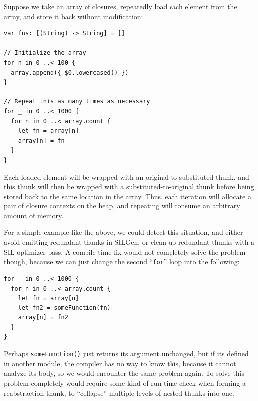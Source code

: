 \documentclass[../generics]{subfiles}
\begin{document}
\begin{example}
Suppose we take an array of closures, repeatedly load each element from the array, and store it back without modification:
\begin{Verbatim}
var fns: [(String) -> String] = []

// Initialize the array
for n in 0 ..< 100 {
  array.append({ $0.lowercased() })
}

// Repeat this as many times as necessary
for _ in 0 ..< 1000 {
  for n in 0 ..< array.count {
    let fn = array[n]
    array[n] = fn
  }
}
\end{Verbatim}
Each loaded element will be wrapped with an original-to-substituted thunk, and this thunk will then be wrapped with a substituted-to-original thunk before being stored back to the same location in the array. Thus, each iteration will allocate a pair of closure contexts on the heap, and repeating will consume an arbitrary amount of memory.

For a simple example like the above, we could detect this situation, and either avoid emitting redundant thunks in SILGen, or clean up redundant thunks with a SIL optimizer pass. A compile-time fix would not completely solve the problem though, because we can just change the second ``\texttt{for}'' loop into the following:
\begin{Verbatim}
for _ in 0 ..< 1000 {
  for n in 0 ..< array.count {
    let fn = array[n]
    let fn2 = someFunction(fn)
    array[n] = fn2
  }
}
\end{Verbatim}
Perhaps \texttt{someFunction()} just returns its argument unchanged, but if its defined in another module, the compiler has no way to know this, because it cannot analyze its body, so we would encounter the same problem again. To solve this problem completely would require some kind of run time check when forming a reabstraction thunk, to ``collapse'' multiple levels of nested thunks into one.
\end{example}
\end{document}
